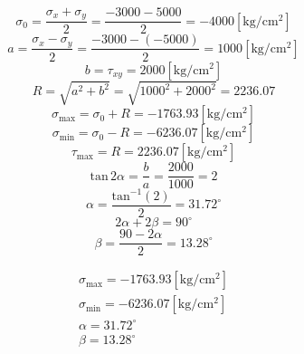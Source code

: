 \documentclass[letter,10pt,twoside]{article}
\begin{document}
\begin{equation*}
    \sigma_0 = \frac{\sigma_x + \sigma_y}{2}
             = \frac{-3000 - 5000}{2}
             = -4000[\text{kg}/\text{cm}^2]
\end{equation*}
\begin{equation*}
    a = \frac{\sigma_x - \sigma_y}{2}
      = \frac{-3000 - (-5000)}{2}
      = 1000[\text{kg}/\text{cm}^2]
\end{equation*}
\begin{equation*}
    b = \tau_{xy}
      = 2000[\text{kg}/\text{cm}^2]
\end{equation*}
\begin{equation*}
    R = \sqrt{a^2 + b^2}
      = \sqrt{1000^2 + 2000^2}
      = 2236.07
\end{equation*}
\begin{equation*}
    \sigma_{\text{max}} = \sigma_0 + R
                        = -1763.93[\text{kg}/\text{cm}^2]
\end{equation*}
\begin{equation*}
    \sigma_{\text{min}} = \sigma_0 - R
                        = -6236.07[\text{kg}/\text{cm}^2]
\end{equation*}
\begin{equation*}
    \tau_{\text{max}} = R
                      = 2236.07[\text{kg}/\text{cm}^2]
\end{equation*}
\begin{equation*}
    \text{tan}\,2\alpha = \frac{b}{a}
                        = \frac{2000}{1000}
                        = 2
\end{equation*}
\begin{equation*}
    \alpha = \frac{\text{tan}^{-1}(2)}{2}
           = 31.72^\circ
\end{equation*}
\begin{equation*}
    2\alpha + 2\beta = 90^\circ
\end{equation*}
\begin{equation*}
    \beta = \frac{90 - 2\alpha}{2}
          = 13.28^\circ
\end{equation*}

\begin{equation*}
\boxed{
    \begin{array}{l}
        \sigma_{\text{max}} = -1763.93[\text{kg}/\text{cm}^2] \\
        \sigma_{\text{min}} = -6236.07[\text{kg}/\text{cm}^2] \\
        \alpha = 31.72^\circ \\
        \beta = 13.28^\circ
    \end{array}
}
\end{equation*}
\end{document}
